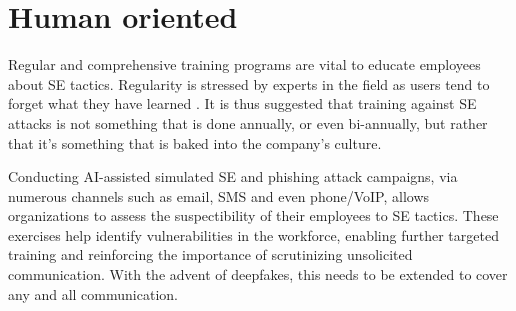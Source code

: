 \begin{comment}
A single dataset formulated as a CSV (comma-separated values) can contain ten or hundreds of thousands of rows of data, each with an URL and data whether it is a legitimate URL or a phishing one.



AI has revolutionized the field of phishing detection by introducing advanced techniques that significantly enhance the accuracy and efficiency of identifying malicious activities.

\subsubsection{AI-assisted deepfake detection}

Building on the foundations of machine learning and other AI technologies discussed above, deepfake detection via AI methods is likewise very resource intensive.

\end{comment}



\section{Human oriented}
\begin{comment}
    
    - The best defense against SE attacks is an educated, conscious user
    - User education should be continuous and not a one-off event

\end{comment}

Regular and comprehensive training programs are vital to educate employees about SE tactics. Regularity is stressed by experts in the field as users tend to forget what they have learned \citep{hadnagySocialEngineering2018, mitnickArtDeceptionControlling2003}. It is thus suggested that training against SE attacks is not something that is done annually, or even bi-annually, but rather that it's something that is baked into the company's culture.

Conducting AI-assisted simulated SE and phishing attack campaigns, via numerous channels such as email, SMS and even phone/VoIP, allows organizations to assess the suspectibility of their employees to SE tactics. These exercises help identify vulnerabilities in the workforce, enabling further targeted training and reinforcing the importance of scrutinizing unsolicited communication. With the advent of deepfakes, this needs to be extended to cover any and all communication.

